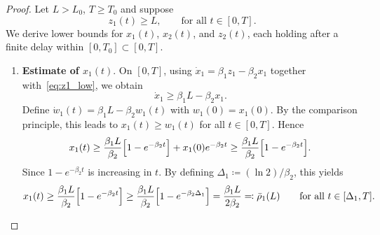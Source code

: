 \documentclass[10pt,a4paper]{amsart}
\begin{document}
\begin{proof}
Let $L>L_0$, $T\ge T_0$ and suppose
\begin{equation}\label{eq:z1_low}
    z_1(t)\ge L, \qquad \text{for all } t\in[0,T].
\end{equation}
We derive lower bounds for $x_1(t)$, $x_2(t)$, and $z_2(t)$, each holding 
after a finite delay within $[0,T_0]\subset[0,T]$.

\begin{enumerate}[leftmargin=*]
    \item \textbf{Estimate of $x_1(t)$}. On $[0,T]$, using 
    $\dot x_1=\beta_1 z_1-\beta_2 x_1$ together with~\eqref{eq:z1_low}, 
    we obtain
    \begin{equation*}
        \dot x_1 \ge \beta_1 L - \beta_2 x_1.
    \end{equation*}
    Define $\dot w_1(t)=\beta_1 L-\beta_2 w_1(t)$ with $w_1(0)=x_1(0)$. 
    By the comparison principle, this leads to $x_1(t)\ge w_1(t)$ for all
    $t\in[0,T]$. Hence
    \begin{equation*}
        x_1(t)\ge \frac{\beta_1 L}{\beta_2}\Bigl[1-e^{-\beta_2 t}\Bigr] 
        + x_1(0)e^{-\beta_2 t}
        \ge \frac{\beta_1 L}{\beta_2}\Bigl[1-e^{-\beta_2 t}\Bigr].
    \end{equation*}
    Since $1-e^{-\beta_2 t}$ is increasing in $t$. By defining $\Delta_1\coloneqq(\ln 2)/\beta_2$, this yields
    \begin{equation}\label{eq:x1_low}
        x_1(t)\ge \frac{\beta_1 L}{\beta_2}\Bigl[1-e^{-\beta_2 t}\Bigr]\ge
        \frac{\beta_1 L}{\beta_2}\Bigl[1-e^{-\beta_2\Delta_1}\Bigr] 
        = \frac{\beta_1 L}{2\beta_2} \eqqcolon \bar\rho_1(L)
        \qquad\text{for all } t\in[\Delta_1,T].
    \end{equation}


\end{enumerate}
\end{proof}
\end{document}
